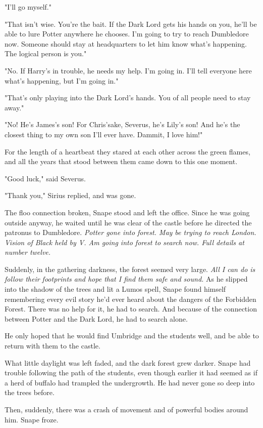 "I'll go myself."

"That isn't wise. You're the bait. If the Dark Lord gets his hands on you, he'll be able to lure Potter anywhere he chooses. I'm going to try to reach Dumbledore now. Someone should stay at headquarters to let him know what's happening. The logical person is you."

"No. If Harry's in trouble, he needs my help. I'm going in. I'll tell everyone here what's happening, but I'm going in."

"That's only playing into the Dark Lord's hands. You of all people need to stay away."

"No! He's James's son! For Chris'sake, Severus, he's Lily's son! And he's the closest thing to my own son I'll ever have. Dammit, I love him!"

For the length of a heartbeat they stared at each other across the green flames, and all the years that stood between them came down to this one moment.

"Good luck," said Severus.

"Thank you," Sirius replied, and was gone.

The floo connection broken, Snape stood and left the office. Since he was going outside anyway, he waited until he was clear of the castle before he directed the patronus to Dumbledore. \emph{Potter gone into forest. May be trying to reach London. Vision of Black held by V. Am going into forest to search now. Full details at number twelve.}

Suddenly, in the gathering darkness, the forest seemed very large. \emph{All I can do is follow their footprints and hope that I find them safe and sound.} As he slipped into the shadow of the trees and lit a Lumos spell, Snape found himself remembering every evil story he'd ever heard about the dangers of the Forbidden Forest. There was no help for it, he had to search. And because of the connection between Potter and the Dark Lord, he had to search alone.

He only hoped that he would find Umbridge and the students well, and be able to return with them to the castle.

What little daylight was left faded, and the dark forest grew darker. Snape had trouble following the path of the students, even though earlier it had seemed as if a herd of buffalo had trampled the undergrowth. He had never gone so deep into the trees before.

Then, suddenly, there was a crash of movement and of powerful bodies around him. Snape froze.


